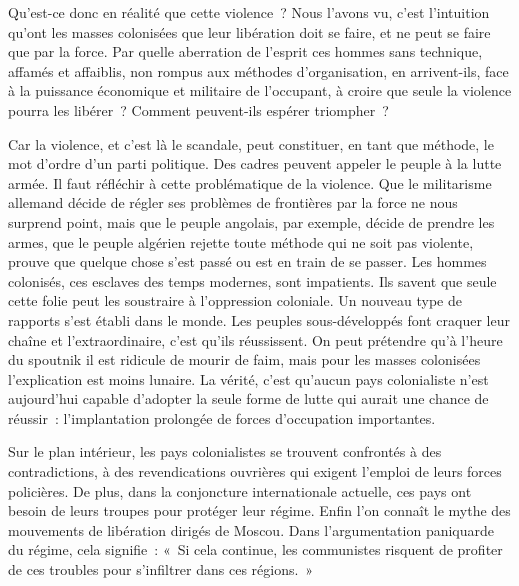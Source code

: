 \documentclass[french,twoside]{book} %
\begin{document}
Qu’est-ce donc en réalité que cette violence ? Nous l’avons vu, c’est l’intuition qu’ont les masses colonisées que leur libération doit se faire, et ne peut se faire que par la force. Par quelle aberration de l’esprit ces hommes sans technique, affamés et affaiblis, non rompus aux méthodes d’organisation, en arrivent-ils, face à la puissance économique et militaire de l’occupant, à croire que seule la violence pourra les libérer ? Comment peuvent-ils espérer triompher ?\par
Car la violence, et c’est là le scandale, peut constituer, en tant que méthode, le mot d’ordre d’un parti politique. Des cadres peuvent appeler le peuple à la lutte armée. Il faut réfléchir à cette problématique de la violence. Que le militarisme allemand décide de régler ses problèmes de frontières par la force ne nous surprend point, mais que le peuple angolais, par exemple, décide de prendre les armes, que le peuple algérien rejette toute méthode qui ne soit pas violente, prouve que quelque chose s’est passé ou est en train de se passer. Les hommes colonisés, ces esclaves des temps modernes, sont impatients. Ils savent que seule cette folie peut les soustraire à l’oppression coloniale. Un nouveau type de rapports s’est établi dans le monde. Les peuples sous-développés font craquer leur chaîne et l’extraordinaire, c’est qu’ils réussissent. On peut prétendre qu’à l’heure du spoutnik il est ridicule de mourir de faim, mais pour les masses colonisées l’explication est moins lunaire. La vérité, c’est qu’aucun pays colonialiste n’est aujourd’hui capable d’adopter la seule forme de lutte qui aurait une chance de réussir : l’implantation prolongée de forces d’occupation importantes.\par
Sur le plan intérieur, les pays colonialistes se trouvent confrontés à des contradictions, à des revendications ouvrières qui exigent l’emploi de leurs forces policières. De plus, dans la   conjoncture internationale actuelle, ces pays ont besoin de leurs troupes pour protéger leur régime. Enfin l’on connaît le mythe des mouvements de libération dirigés de Moscou. Dans l’argumentation paniquarde du régime, cela signifie : « Si cela continue, les communistes risquent de profiter de ces troubles pour s’infiltrer dans ces régions. »\par
\bigbreak
\end{document}
